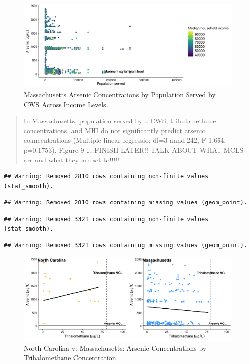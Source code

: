 \documentclass[12pt,]{article}
\begin{document}
\begin{figure}
\centering
\includegraphics{Project_Template_files/figure-latex/figs10-1.pdf}
\caption{Massachusetts Arsenic Concentrations by Population Served by
CWS Across Income Levels.}
\end{figure}

\begin{quote}
In Massachusetts, population served by a CWS, trihalomethane
concentrations, and MHI do not significantly predict arsenic
conncentrations (Multiple linear regressio; df=3 annd 242, F-1.664,
p=0.1753). Figure 9 \ldots{}..FINISH LATER!! TALK ABOUT WHAT MCLS are
and what they are set to!!!!!
\end{quote}

\begin{verbatim}
## Warning: Removed 2810 rows containing non-finite values (stat_smooth).
\end{verbatim}

\begin{verbatim}
## Warning: Removed 2810 rows containing missing values (geom_point).
\end{verbatim}

\begin{verbatim}
## Warning: Removed 3321 rows containing non-finite values (stat_smooth).
\end{verbatim}

\begin{verbatim}
## Warning: Removed 3321 rows containing missing values (geom_point).
\end{verbatim}

\begin{figure}
\centering
\includegraphics{Project_Template_files/figure-latex/figs11-1.pdf}
\caption{North Carolina v. Massachusetts: Arsenic Concentrations by
Trihalomethane Concentration.}
\end{figure}
\end{document}
